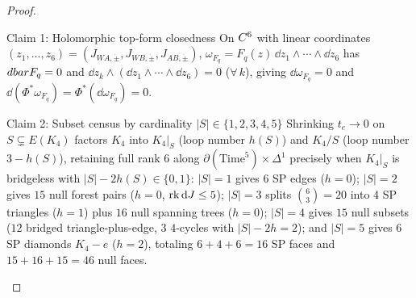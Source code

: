 \begin{proof}\leavevmode
\begin{proofpart}{Claim 1: Holomorphic top-form closedness}
On $C^6$ with linear coordinates $(z_1,\dots,z_6) = (J_{WA,\dot{\pm}}, J_{WB,\dot{\pm}}, J_{AB,\dot{\pm}})$, $\omega_{F_q} = F_q(z)\,\dd z_1\wedge\cdots\wedge\dd z_6$ has $dbar F_q = 0$ and $\dd z_k\wedge(\dd z_1\wedge\cdots\wedge\dd z_6) = 0$ ($\forall\,k$), giving $\dd\omega_{F_q} = 0$ and $\dd(\Phi^*\omega_{F_q}) = \Phi^*(\dd\omega_{F_q}) = 0$.
\end{proofpart}
\begin{proofpart}{Claim 2: Subset census by cardinality $|S| \in \{1,2,3,4,5\}$}
Shrinking $t_e \to 0$ on $S \subsetneq E(K_4)$ factors $K_4$ into $K_4|_S$ (loop number $h(S)$) and $K_4/S$ (loop number $3-h(S)$), retaining full rank $6$ along $\partial(\mathrm{Time}^5)\times\Delta^1$ precisely when $K_4|_S$ is bridgeless with $|S| - 2h(S) \in \{0,1\}$: $|S|=1$ gives $6$ SP edges ($h=0$); $|S|=2$ gives $15$ null forest pairs ($h=0$, $\operatorname{rk}\mathrm{d} J \le 5$); $|S|=3$ splits $\binom{6}{3}=20$ into $4$ SP triangles ($h=1$) plus $16$ null spanning trees ($h=0$); $|S|=4$ gives $15$ null subsets ($12$ bridged triangle-plus-edge, $3$ $4$-cycles with $|S|-2h=2$); and $|S|=5$ gives $6$ SP diamonds $K_4-e$ ($h=2$), totaling $6+4+6 = 16$ SP faces and $15+16+15 = 46$ null faces.
\end{proofpart}
\end{proof}

